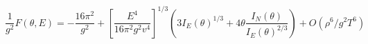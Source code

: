 \begin{equation}
\label{3-15}
\frac{1}{g^2}F(\theta,E) = -\frac{16\pi^2}{g^2} + 
\left[\frac{E^4}{16 \pi^2 g^2 v^4}\right]^{1/3}
\left(3I_E(\theta)^{1/3}+ 4\theta\frac{I_N(\theta)}{I_E(\theta)^{2/3}}\right)
+ O(\rho^6/g^2 T^6)
\end{equation}

